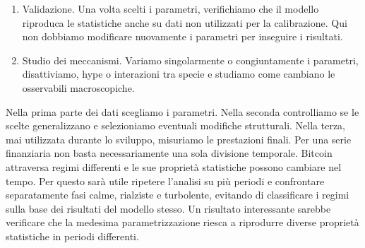\begin{enumerate}
    casuale e passare successivamente a metodi più efficienti.
    \begin{approfondimento}
        Una volta definita la funzione obiettivo della calibrazione, dobbiamo scegliere un algoritmo che individui i valori dei parametri 
        fenomenologici dell'ABM capaci di riprodurre meglio le statistiche macroscopiche del mercato reale. Questo è un problema di ottimizzazione 
        numerica, con una difficoltà aggiuntiva: il nostro modello è stocastico, cioè un certo insieme di parametri potrebbe sembrare 
        migliore di un altro soltanto per fluttuazioni statistiche. Esistono alcuni algoritmi i più semplici sono grid search dove per er ciascun parametro definiamo un 
        insieme discreto di valori e proviamo tutte le combinazioni possibili, che ha chiaramente uno svantaggio dal punto di vista computazionale, e
        random search, dove estraiamo casualmente combinazioni di parametri all'interno degli intervalli consentiti. Per citare un metodo più 
        sofisticato, possiamo considerare l'algoritmo di ottimizzazione bayesiana, che potrebbe essere utile quando il costo computazionale di una 
        singola simulazione è elevato. 
    \end{approfondimento}
    \item Validazione. Una volta scelti i parametri, verifichiamo che il modello riproduca le statistiche anche su dati non utilizzati per la 
    calibrazione. Qui non dobbiamo modificare nuovamente i parametri per inseguire i risultati.
    \item Studio dei meccanismi. Variamo singolarmente o congiuntamente i parametri, disattiviamo, hype o interazioni tra specie e 
    studiamo come cambiano le osservabili macroscopiche.
\end{enumerate}

Nella prima parte dei dati scegliamo i parametri. Nella seconda controlliamo se le scelte generalizzano e selezioniamo eventuali modifiche strutturali. 
Nella terza, mai utilizzata durante lo sviluppo, misuriamo le prestazioni finali. Per una serie finanziaria non basta necessariamente una sola 
divisione temporale. Bitcoin attraversa regimi differenti e le sue proprietà statistiche possono cambiare nel tempo. Per questo sarà utile ripetere 
l'analisi su più periodi e confrontare separatamente fasi calme, rialziste e turbolente, evitando di classificare i regimi sulla base dei risultati 
del modello stesso. Un risultato interessante sarebbe verificare che la medesima parametrizzazione riesca a riprodurre diverse proprietà statistiche 
in periodi differenti.


